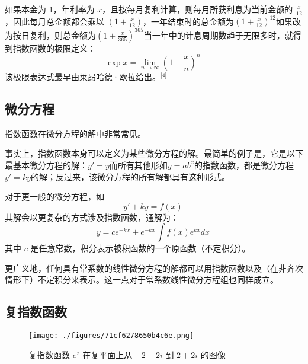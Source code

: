 如果本金为 1，年利率为 $x$，且按每月复利计算，则每月所获利息为当前金额的 $\frac{x}{12}$，因此每月总金额都会乘以 $(1 + \frac{x}{12})$，一年结束时的总金额为$(1 + \frac{x}{12})^{12}$如果改为按日复利，则总金额为$(1 + \frac{x}{365})^{365}$当一年中的计息周期数趋于无限多时，就得到指数函数的极限定义：
$$
\exp x = \lim_{n \to \infty} \left(1 + \frac{x}{n} \right)^n~
$$
该极限表达式最早由莱昂哈德·欧拉给出。\(^\text{[4]}\)
\subsection{微分方程}
指数函数在微分方程的解中非常常见。

事实上，指数函数本身可以定义为某些微分方程的解。最简单的例子是，它是以下最基本微分方程的解：$y' = y$而所有其他形如$y = a b^x$的指数函数，都是微分方程$y' = k y$的解；反过来，该微分方程的所有解都具有这种形式。

对于更一般的微分方程，如
$$
y' + k y = f(x)~
$$
其解会以更复杂的方式涉及指数函数，通解为：
$$
y = c e^{-k x} + e^{-k x} \int f(x) e^{k x}dx~
$$
其中 $c$ 是任意常数，积分表示被积函数的一个原函数（不定积分）。

更广义地，任何具有常系数的线性微分方程的解都可以用指数函数以及（在非齐次情形下）不定积分来表示。这一点对于常系数线性微分方程组也同样成立。
\subsection{复指数函数}
\begin{figure}[ht]
\centering
\texttt{[image: ./figures/71cf6278650b4c6e.png]}
\caption{复指数函数 $e^z$ 在复平面上从 $-2 - 2i$ 到 $2 + 2i$ 的图像} \label{fig_ZShs_4}
\end{figure}
